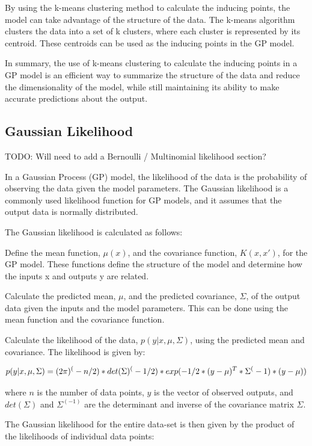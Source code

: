 \documentclass[12pt,a4paper]{report}
\begin{document}
By using the k-means clustering method to calculate the inducing points, the model can take advantage of the structure of the data. 
The k-means algorithm clusters the data into a set of k clusters, where each cluster is represented by its centroid. 
These centroids can be used as the inducing points in the GP model.

In summary, the use of k-means clustering to calculate the inducing points in a GP model is an efficient way to summarize the structure of the data and reduce the dimensionality of the model, while still maintaining its ability to make accurate predictions about the output.

\subsection{Gaussian Likelihood}

TODO: Will need to add a Bernoulli / Multinomial likelihood section?

In a Gaussian Process (GP) model, the likelihood of the data is the probability of observing the data given the model parameters. 
The Gaussian likelihood is a commonly used likelihood function for GP models, and it assumes that the output data is normally distributed.

The Gaussian likelihood is calculated as follows:

Define the mean function, $\mu(x)$, and the covariance function, $K(x, x')$, for the GP model. 
These functions define the structure of the model and determine how the inputs x and outputs y are related.

Calculate the predicted mean, $\mu$, and the predicted covariance, $\Sigma$, of the output data given the inputs and the model parameters. 
This can be done using the mean function and the covariance function.

Calculate the likelihood of the data, $p(y|x, \mu, \Sigma)$, using the predicted mean and covariance. 
The likelihood is given by:

\begin{equation}
    \centering
    p(y|x, \mu, \Sigma) = (2\pi)^(-n/2) * det(\Sigma)^(-1/2) * exp(-1/2 * (y - \mu)^T * \Sigma^(-1) * (y - \mu))
\end{equation}

where $n$ is the number of data points, $y$ is the vector of observed outputs, and $det(\Sigma)$ and $\Sigma^(-1)$ are the determinant and inverse of the covariance matrix $\Sigma$.

The Gaussian likelihood for the entire data-set is then given by the product of the likelihoods of individual data points:
\end{document}
